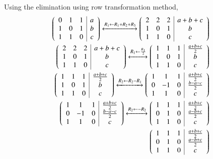\documentclass[journal,12pt,twocolumn]{IEEEtran}
\theoremstyle{remark}
\begin{document}
\vspace{0.3cm}
Using the elimination using row transformation method,
\begin{align}
\begin{pmatrix}\begin{array}{ccc|c}
0&1&1&a\\1&0&1&b\\1&1&0&c
\end{array}
\end{pmatrix}
\xleftrightarrow[]{R_1 \leftarrow R_1 + R_2 + R_3}
\begin{pmatrix}\begin{array}{ccc|c}
2&2&2&a+b+c\\1&0&1&b\\1&1&0&c
\end{array}
\end{pmatrix}\\
\begin{pmatrix}\begin{array}{ccc|c}
2&2&2&a+b+c\\1&0&1&b\\1&1&0&c
\end{array}
\end{pmatrix}
\xleftrightarrow[]{R_1 \leftarrow \frac{R_1}{2}}
\begin{pmatrix}\begin{array}{ccc|c}
1&1&1&\frac{a+b+c}{2}\\1&0&1&b\\1&1&0&c
\end{array}
\end{pmatrix}\\
\begin{pmatrix}\begin{array}{ccc|c}
1&1&1&\frac{a+b+c}{2}\\1&0&1&b\\1&1&0&c
\end{array}
\end{pmatrix}
\xleftrightarrow[]{R_2 \leftarrow R_2 - R_1}
\begin{pmatrix}\begin{array}{ccc|c}
1&1&1&\frac{a+b+c}{2}\\0&-1&0&\frac{b-a-c}{2}\\1&1&0&c
\end{array}
\end{pmatrix}\\
\begin{pmatrix}\begin{array}{ccc|c}
1&1&1&\frac{a+b+c}{2}\\0&-1&0&\frac{b-a-c}{2}\\1&1&0&c
\end{array}
\end{pmatrix}
\xleftrightarrow[]{R_2 \leftarrow -R_2}
\begin{pmatrix}\begin{array}{ccc|c}
1&1&1&\frac{a+b+c}{2}\\0&1&0&\frac{a-b+c}{2}\\1&1&0&c
\end{array}
\end{pmatrix}\\
\begin{pmatrix}\begin{array}{ccc|c}
1&1&1&\frac{a+b+c}{2}\\0&1&0&\frac{a-b+c}{2}\\1&1&0&c

\end{array}\end{pmatrix}
\end{align}
\end{document}

